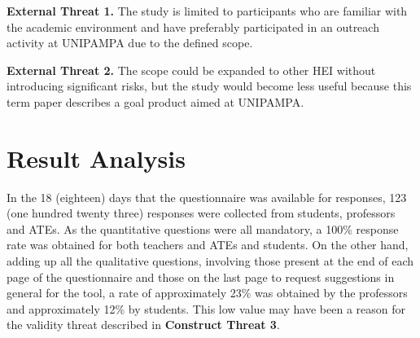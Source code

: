 \begin{description}
  \item \textbf{External Threat 1.} The study is limited to participants who are familiar with the academic environment and have preferably participated in an outreach activity at \ac{UNIPAMPA} due to the defined scope.\label{et:1}
  \item \textbf{External Threat 2.} The scope could be expanded to other \ac{HEI} without introducing significant risks, but the study would become less useful because this term paper describes a goal product aimed at \ac{UNIPAMPA}.\label{et:2}
\end{description}


\section{Result Analysis}\label{sec:survey-results}

In the 18 (eighteen) days that the questionnaire was available for responses, 123 (one hundred twenty three) responses were collected from students, professors and \acp{ATE}. 
As the quantitative questions were all mandatory, a 100\% response rate was obtained for both teachers and \acp{ATE} and students. 
On the other hand, adding up all the qualitative questions, involving those present at the end of each page of the questionnaire and those on the last page to request suggestions in general for the tool, a rate of approximately 23\% was obtained by the professors and approximately 12\% by students. 
This low value may have been a reason for the validity threat described in \textbf{Construct Threat 3}.

